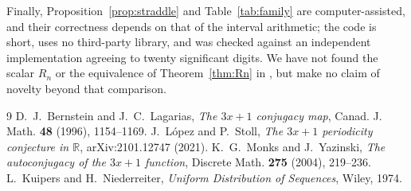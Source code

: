 \documentclass[11pt,a4paper]{article}
\theoremstyle{plain}
\theoremstyle{definition}
\begin{document}
Finally, Proposition~\ref{prop:straddle} and Table~\ref{tab:family} are computer-assisted, and their
correctness depends on that of the interval arithmetic; the code is short, uses no third-party
library, and was checked against an independent implementation agreeing to twenty significant
digits. We have not found the scalar $R_n$ or the equivalence of Theorem~\ref{thm:Rn} in \cite{LS},
but make no claim of novelty beyond that comparison.

\begin{thebibliography}{9}
 D.~J.~Bernstein and J.~C.~Lagarias, \emph{The $3x+1$ conjugacy map},
Canad. J. Math. \textbf{48} (1996), 1154--1169.
 J.~L\'opez and P.~Stoll, \emph{The $3x+1$ periodicity conjecture in $\mathbb{R}$},
arXiv:2101.12747 (2021).
 K.~G.~Monks and J.~Yazinski, \emph{The autoconjugacy of the $3x+1$ function},
Discrete Math. \textbf{275} (2004), 219--236.
 L.~Kuipers and H.~Niederreiter, \emph{Uniform Distribution of Sequences}, Wiley, 1974.
\end{thebibliography}
\end{document}
